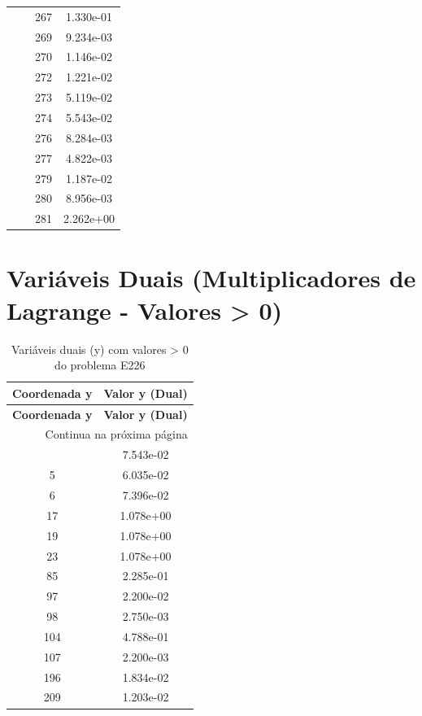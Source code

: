 \documentclass[12pt]{article}
\begin{document}
\begin{longtable}{@{}cccc@{}}
 &  & 267 & 1.330e-01 \\
 &  & 269 & 9.234e-03 \\
 &  & 270 & 1.146e-02 \\
 &  & 272 & 1.221e-02 \\
 &  & 273 & 5.119e-02 \\
 &  & 274 & 5.543e-02 \\
 &  & 276 & 8.284e-03 \\
 &  & 277 & 4.822e-03 \\
 &  & 279 & 1.187e-02 \\
 &  & 280 & 8.956e-03 \\
 &  & 281 & 2.262e+00 \\

\bottomrule
\end{longtable}


\section{Variáveis Duais (Multiplicadores de Lagrange - Valores > 0)}

\begin{longtable}{@{}cc@{}}
\caption{Variáveis duais (y) com valores > 0 do problema E226} \\
\toprule
\textbf{Coordenada y} & \textbf{Valor y (Dual)} \\
\midrule
\endfirsthead

\toprule
\textbf{Coordenada y} & \textbf{Valor y (Dual)} \\
\midrule
\endhead

\midrule \multicolumn{2}{r}{{Continua na próxima página}} \\ \midrule
\endfoot

\bottomrule
\endlastfoot
2 & 7.543e-02 \\
5 & 6.035e-02 \\
6 & 7.396e-02 \\
17 & 1.078e+00 \\
19 & 1.078e+00 \\
23 & 1.078e+00 \\
85 & 2.285e-01 \\
97 & 2.200e-02 \\
98 & 2.750e-03 \\
104 & 4.788e-01 \\
107 & 2.200e-03 \\
196 & 1.834e-02 \\
209 & 1.203e-02 \\

\bottomrule
\end{longtable}
\end{document}

